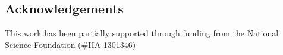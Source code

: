 \documentclass[final]{beamer}
\begin{document}
\begin{frame}[t]
\begin{multicols}{3}

\subsection{Acknowledgements}

This work has been partially supported through funding from the National
Science Foundation (\#IIA-1301346)







\end{multicols}

\end{frame}
\end{document}
